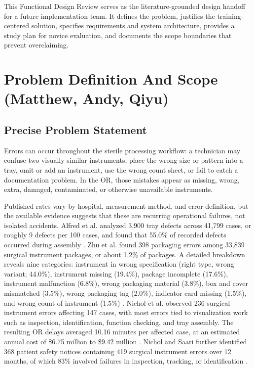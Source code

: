 \documentclass[10pt,a4paper]{article}
\begin{document}
This Functional Design Review serves as the literature-grounded design handoff
for a future implementation team. It defines the problem, justifies the
training-centered solution, specifies requirements and system architecture,
provides a study plan for novice evaluation, and documents the scope boundaries
that prevent overclaiming.


\section{Problem Definition And Scope \hfill {\normalfont\small (Matthew, Andy, Qiyu)}}
\label{sec:problem-definition-and-scope}
\subsection{Precise Problem Statement}
\label{sec:precise-problem-statement}

Errors can occur throughout the sterile processing workflow: a technician may
confuse two visually similar instruments, place the wrong size or pattern into a
tray, omit or add an instrument, use the wrong count sheet, or fail to catch a
documentation problem. In the OR, those mistakes appear as missing, wrong,
extra, damaged, contaminated, or otherwise unavailable instruments.

Published rates vary by hospital, measurement method, and error definition, but
the available evidence suggests that these are recurring operational failures,
not isolated accidents. Alfred et al. analyzed 3,900 tray defects across 41,799
cases, or roughly 9 defects per 100 cases, and found that 55.0\% of recorded
defects occurred during assembly
\cite{alfred-et-al-2021}. Zhu et al. found
398 packaging errors among 33,839 surgical instrument packages, or about 1.2\%
of packages. A detailed breakdown reveals nine categories: instrument in wrong specification (right type, wrong variant; 44.0\%), instrument missing (19.4\%), package incomplete (17.6\%),
instrument malfunction (6.8\%), wrong packaging material (3.8\%), box and cover
mismatched (3.5\%), wrong packaging tag (2.0\%), indicator card missing (1.5\%),
and wrong count of instrument (1.5\%)
\cite{zhu-et-al-2019}. Nichol et al.
observed 236 surgical instrument errors affecting 147 cases, with most errors
tied to visualization work such as inspection, identification, function
checking, and tray assembly. The resulting OR delays averaged 10.16 minutes per
affected case, at an estimated annual cost of \$6.75 million to \$9.42 million
\cite{nichol-et-al-2024}. Nichol and Saari
further identified 368 patient safety notices containing 419 surgical instrument
errors over 12 months, of which 83\% involved failures in inspection, tracking,
or identification
\cite{nichol-and-saari-2023}.
\end{document}
